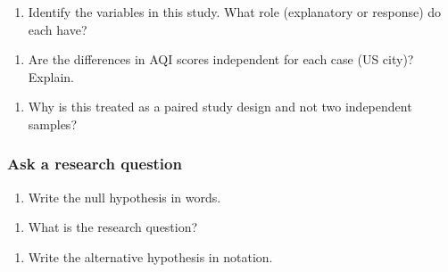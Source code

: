 \documentclass[
]{report}
\providecommand{\tightlist}{%
  \setlength{\itemsep}{0pt}\setlength{\parskip}{0pt}}
\begin{document}
\begin{enumerate}
\def\labelenumi{\arabic{enumi}.}
\tightlist
\item
  Identify the variables in this study. What role (explanatory or response) do each have?
\end{enumerate}

\vspace{.5in}

\begin{enumerate}
\def\labelenumi{\arabic{enumi}.}
\setcounter{enumi}{1}
\tightlist
\item
  Are the differences in AQI scores independent for each case (US city)? Explain.
\end{enumerate}

\vspace{0.5in}

\begin{enumerate}
\def\labelenumi{\arabic{enumi}.}
\setcounter{enumi}{2}
\tightlist
\item
  Why is this treated as a paired study design and not two independent samples?
\end{enumerate}

\vspace{0.5in}

\hypertarget{ask-a-research-question-2}{%
\subsubsection*{Ask a research question}\label{ask-a-research-question-2}}

\begin{enumerate}
\def\labelenumi{\arabic{enumi}.}
\setcounter{enumi}{3}
\tightlist
\item
  Write the null hypothesis in words.
\end{enumerate}

\vspace{0.8in}

\begin{enumerate}
\def\labelenumi{\arabic{enumi}.}
\setcounter{enumi}{4}
\tightlist
\item
  What is the research question?
\end{enumerate}

\vspace{0.8in}

\begin{enumerate}
\def\labelenumi{\arabic{enumi}.}
\setcounter{enumi}{5}
\tightlist
\item
  Write the alternative hypothesis in notation.
\end{enumerate}
\end{document}
